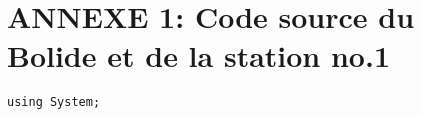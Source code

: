 \section{ANNEXE 1: Code source du Bolide et de la station no.1}
\begin{lstlisting}
using System;
\end{lstlisting}